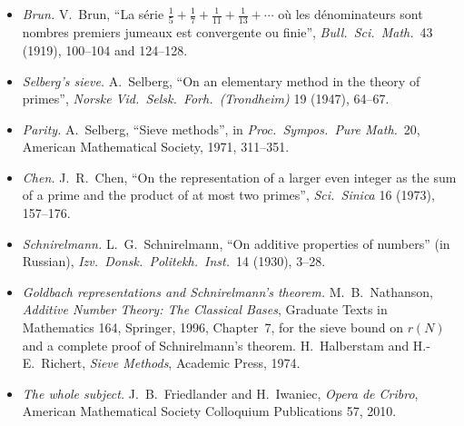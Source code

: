 \begin{itemize}
\item \emph{Brun.} V.~Brun, ``La série $\frac15+\frac17+\frac1{11}+\frac1{13}+\cdots$ où les dénominateurs sont nombres premiers jumeaux est convergente ou finie'', \emph{Bull.\ Sci.\ Math.}\ 43 (1919), 100--104 and 124--128.
\item \emph{Selberg's sieve.} A.~Selberg, ``On an elementary method in the theory of primes'', \emph{Norske Vid.\ Selsk.\ Forh.\ (Trondheim)} 19 (1947), 64--67.
\item \emph{Parity.} A.~Selberg, ``Sieve methods'', in \emph{Proc.\ Sympos.\ Pure Math.}\ 20, American Mathematical Society, 1971, 311--351.
\item \emph{Chen.} J.~R.~Chen, ``On the representation of a larger even integer as the sum of a prime and the product of at most two primes'', \emph{Sci.\ Sinica} 16 (1973), 157--176.
\item \emph{Schnirelmann.} L.~G.~Schnirelmann, ``On additive properties of numbers'' (in Russian), \emph{Izv.\ Donsk.\ Politekh.\ Inst.}\ 14 (1930), 3--28.
\item \emph{Goldbach representations and Schnirelmann's theorem.} M.~B.~Nathanson, \emph{Additive Number Theory: The Classical Bases}, Graduate Texts in Mathematics 164, Springer, 1996, Chapter~7, for the sieve bound on $r(N)$ and a complete proof of Schnirelmann's theorem. H.~Halberstam and H.-E.~Richert, \emph{Sieve Methods}, Academic Press, 1974.
\item \emph{The whole subject.} J.~B.~Friedlander and H.~Iwaniec, \emph{Opera de Cribro}, American Mathematical Society Colloquium Publications 57, 2010.
\end{itemize}

